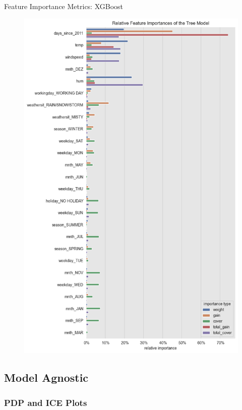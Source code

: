 \documentclass[10pt]{beamer}
\begin{document}
\begin{frame}{Feature Importance Metrics: XGBoost}
\begin{center}
  \begin{figure}
    \includegraphics[scale=0.27]{images/interpretable_ml_81_0.png}
  \end{figure}
\end{center}
\end{frame}

\subsection{Model Agnostic}

\subsubsection{PDP and ICE Plots}
\end{document}
